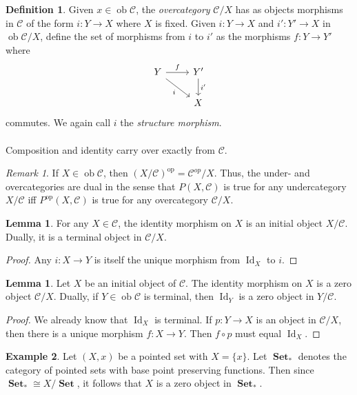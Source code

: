 \documentclass[10pt,letterpaper,cm]{nupset}
\theoremstyle{definition}
\newtheorem{definition}{Definition}
\newtheorem{exmp}[definition]{Example}
\theoremstyle{theorem}
\newtheorem{lemma}[theorem]{Lemma}
\theoremstyle{remark}
\newtheorem{remark}{Remark}
\newcommand{\1}{\mathbf{1}}
\renewcommand{\c}{\mathscr{C}}
\newcommand{\0}{\vec 0}
\DeclareMathOperator{\id}{Id}
\DeclareMathOperator{\op}{op}
\DeclareMathOperator{\ob}{ob}
\DeclareMathOperator{\set}{\mathbf{Set}}
\begin{document}
\begin{definition}
Given $x \in \ob \c$, the \textit{overcategory} ${\c}/{X}$ has as objects morphisms in $\c$ of the form $i : Y \to X$ where $X$ is fixed. Given $i:  Y \to X$ and  $i' : Y' \to X$ in $\ob {\c}/{X}$, define the set of morphisms from $i$ to $i'$ as the morphisms $f: Y \to Y'$ where
\[ \begin{tikzcd}
Y \arrow[r, "f"] \arrow[swap, dr,  " i "] & Y' \arrow[d, "i '"] \\%
 & X
\end{tikzcd}
\]
commutes. We again call $i$ the \textit{structure morphism}.
\\ \\ Composition and identity carry over exactly from $\c$.
\end{definition}

\begin{remark}
If $X \in \ob \c$, then $({X}/{\c})^{\op} = {\c^{op}}/{X}$. Thus, the under- and overcategories are dual in the sense that $P(X, \c)$ is true for any undercategory ${X}/{\c}$ iff $P^{\op}(X, \c)$ is true for any overcategory ${\c}/{X}$. 
\end{remark}

\begin{lemma}
For any $X \in \c$, the identity morphism on $X$ is an initial object ${X}/{\c}$. Dually, it is a terminal object in ${\c}/{X}$.
\end{lemma}
\begin{proof}
Any $i: X \to Y$ is itself the unique morphism from $\id_X$ to $i$.
\end{proof}

\begin{lemma}
Let $X$ be an initial object of $\c$. The identity morphism on $X$ is a zero object ${\c}/{X}$. Dually, if $Y \in \ob \c$ is terminal, then $\id_Y$ is a zero object in ${Y}/{\c}$.
\end{lemma}
\begin{proof}
We already know that $\id_X$ is terminal. If $p: Y \to X$ is an object in ${\c}/{X}$, then there is a unique morphism $f: X \to Y$. Then $f\circ p$ must equal $\id_X$.
\end{proof}

\begin{exmp}
Let $(X, x)$ be a pointed set with $X= \{x\}$. Let $\set_{\ast}$ denotes the category of pointed sets with base point preserving functions. Then since $\set_{\ast} \cong {X}/{\set}$, it follows that $X$ is a zero object in $\set_{\ast}$.
\end{exmp}
\end{document}
